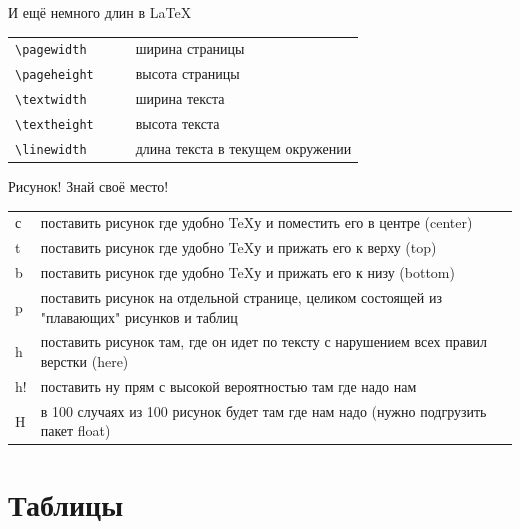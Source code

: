 \documentclass[aspectratio=169]{beamer} %
\begin{document}
\begin{frame}[fragile]{ }
\begin{block}{И ещё немного длин в \LaTeX}
\centering 
	\begin{tabulary}{\textwidth}{JccL}
		\toprule
			\verb|\pagewidth|  & & &ширина страницы \\
			\verb|\pageheight| & & &высота страницы \\
			\verb|\textwidth|  & & &ширина текста   \\
			\verb|\textheight| & & &высота текста   \\
			\verb|\linewidth|  & & & длина текста в текущем окружении \\
		\bottomrule
	\end{tabulary}
\end{block}
\end{frame} 

\begin{frame}[fragile]{ }
\begin{block}{Рисунок! Знай своё место!}
\centering 
	\begin{tabulary}{\textwidth}{JL}
		\toprule
			с & поставить рисунок где удобно \TeX у и поместить его в центре (center) \\
			t & поставить рисунок где удобно \TeX у и прижать его к верху (top) \\
			b & поставить рисунок где удобно \TeX у и прижать его к низу   (bottom) \\
			p & поставить рисунок на отдельной странице, целиком состоящей из "плавающих" рисунков и таблиц \\
			h & поставить рисунок там, где он идет по тексту с нарушением всех правил верстки (here)  \\
		   h! & поставить ну прям с высокой вероятностью там где надо нам \\
			H & в 100 случаях из 100 рисунок будет там где нам надо (нужно подгрузить пакет float) \\
		\bottomrule
	\end{tabulary}
\end{block}
\end{frame} 


\section{Таблицы} 

\end{document}
